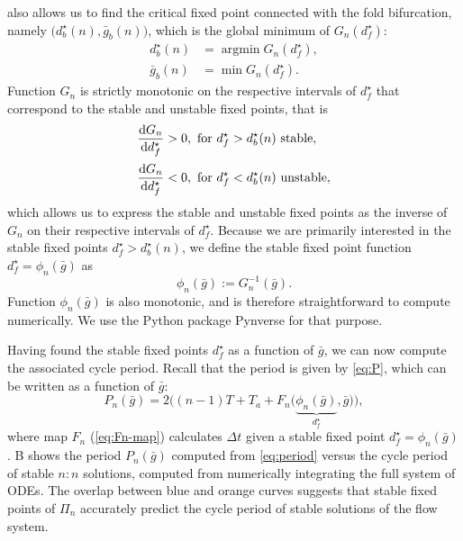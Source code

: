  also allows us to find the critical fixed point connected with the fold bifurcation, namely $\big(d^\star_b(n), \bar g_b(n)\big)$, which is the global minimum
of $G_n(d^\star_f)$:
\begin{align}
	d^\star_b(n) & = \operatorname{argmin} G_n(d^\star_f), \\
	\bar g_b(n)  & = \min{G_n(d^\star_f)}.
\end{align}
Function $G_n$ is strictly monotonic on the respective intervals of $d^\star_f$ that correspond to the stable and unstable fixed points, that is
\begin{align}
	\dv{G_n}{d^\star_f} & > 0, \text{ for } d^\star_f>d^\star_b(n) \text{ stable},   \\[0.5ex]
	\dv{G_n}{d^\star_f} & < 0, \text{ for } d^\star_f<d^\star_b(n) \text{ unstable},
\end{align}
which allows us to express the stable and unstable fixed points as the inverse of $G_n$ on their respective intervals of $d^\star_f$.
Because we are primarily interested in the stable fixed points $d^\star_f>d^\star_b(n)$, we define the stable fixed point function $d^\star_f = \phi_n(\bar g)$ as
\begin{equation}
	\label{eq:phi}
	\phi_n(\bar g):= G_n^{-1}(\bar g).
\end{equation}
Function $\phi_n(\bar g)$ is also monotonic, and is therefore straightforward to compute numerically.
We use the Python package Pynverse \citep{pynverse} for that purpose.

Having found the stable fixed points $d^\star_f$ as a function of $\bar g$, we can now compute the associated cycle period.
Recall that the period is given by \cref{eq:P}, which can be written as a function of $\bar g$:
\begin{equation}
	\label{eq:period}
	P_n(\bar g) = 2 \Big(
	(n-1)T + T_{a} + F_n\big(\underbrace{\phi_n(\bar g)}_{d^\star_f}, \bar g\big)
	\Big),
\end{equation}
where map $F_n$ (\cref{eq:Fn-map}) calculates $\Delta t$ given a stable fixed point $d^\star_f=\phi_n(\bar g)$.
B shows the period $P_{n}(\bar g)$ computed from \cref{eq:period} versus the cycle period of stable $n:n$ solutions, computed from numerically integrating the full system of ODEs.
The overlap between blue and orange curves suggests that stable fixed points of $\Pi_{n}$ accurately predict the cycle period of stable solutions of the flow system.

